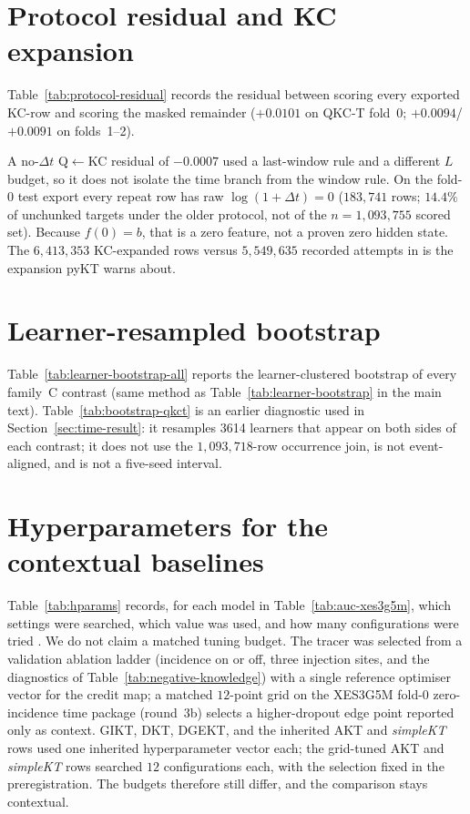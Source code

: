 \documentclass[review,12pt]{elsarticle}
\begin{document}
\FloatBarrier
\section{Protocol residual and KC expansion}
\label{app:protocol-residual}
Table~\ref{tab:protocol-residual} records the residual between scoring
every exported KC-row and scoring the masked remainder
($+0.0101$ on QKC-T fold~0; $+0.0094$/$+0.0091$ on folds~1--2).



A no-$\Delta t$ Q$\leftarrow$KC residual of $-0.0007$ used a last-window
rule and a different $L$ budget, so it does not isolate the time branch
from the window rule. On the fold-0 test export every repeat row has
raw $\log(1{+}\Delta t){=}0$ ($183{,}741$ rows; $14.4\%$ of unchunked
targets under the older protocol, not of the $n{=}1{,}093{,}755$ scored
set). Because $f(0)=b$, that is a zero feature, not a proven zero hidden
state. The $6{,}413{,}353$ KC-expanded rows versus $5{,}549{,}635$
recorded attempts in \cite{liu2023xes3g5m} is the expansion pyKT warns
about.
\FloatBarrier

\section{Learner-resampled bootstrap}
\label{app:bootstrap}
Table~\ref{tab:learner-bootstrap-all} reports the learner-clustered
bootstrap of every family~C contrast (same method as
Table~\ref{tab:learner-bootstrap} in the main text).
Table~\ref{tab:bootstrap-qkct} is an earlier diagnostic used in
Section~\ref{sec:time-result}: it resamples 3614 learners that appear
on both sides of each contrast; it does not use the
$1{,}093{,}718$-row occurrence join, is not event-aligned, and is not a
five-seed interval.



\FloatBarrier

\section{Hyperparameters for the contextual baselines}
\label{app:hparams}
Table~\ref{tab:hparams} records, for each model in
Table~\ref{tab:auc-xes3g5m}, which settings were searched, which value
was used, and how many configurations were tried
\cite{pineau2021repro}. We do not claim a matched tuning budget. The
tracer was selected from a validation ablation ladder (incidence on or
off, three injection sites, and the diagnostics of
Table~\ref{tab:negative-knowledge}) with a single reference optimiser
vector for the credit map; a matched $12$-point grid on the XES3G5M
fold-0 zero-incidence time package (round~3b) selects a higher-dropout
edge point reported only as context. GIKT, DKT, DGEKT, and the inherited
AKT and \textit{simpleKT} rows used one inherited hyperparameter vector
each; the grid-tuned AKT and \textit{simpleKT} rows searched $12$
configurations each, with the selection fixed in the preregistration.
The budgets therefore still differ, and the comparison stays contextual.
\end{document}
